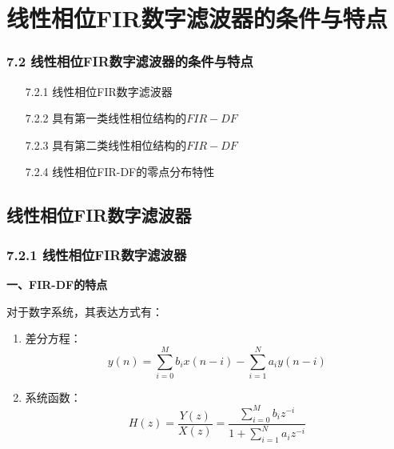\documentclass[notheorems,compress,mathserif,table]{beamer}
\begin{document}
\section{线性相位FIR数字滤波器的条件与特点}


\begin{frame}\frametitle{7.2 线性相位FIR数字滤波器的条件与特点}%

\begin{enumerate}
  \item [7.2.1 ] 线性相位FIR数字滤波器
  \item [7.2.2 ] 具有第一类线性相位结构的$FIR-DF$
  \item [7.2.3 ] 具有第二类线性相位结构的$FIR-DF$
  \item [7.2.4 ] 线性相位FIR-DF的零点分布特性
\end{enumerate}
\end{frame}


\subsection{线性相位FIR数字滤波器}


\begin{frame}[shrink]\frametitle{7.2.1 线性相位FIR数字滤波器}%
\textbf{一、FIR-DF的特点}

    对于数字系统，其表达方式有：
    \begin{enumerate}
      \item \quad\quad 差分方程：
          $$y(n)=\sum_{i=0}^{M}b_ix(n-i) - \sum_{i=1}^{N}a_iy(n-i)$$

      \item \quad\quad 系统函数：
          $$H(z)=\frac{Y(z)}{X(z)}= \frac{\sum_{i=0}^{M}b_iz^{-i}}{1+\sum_{i=1}^{N}a_i z^{-i}}$$
    \end{enumerate}
\end{frame}
\end{document}
